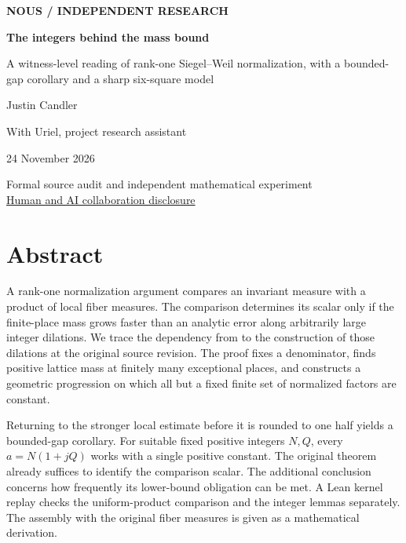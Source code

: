 \documentclass[12pt,letterpaper]{article}
\newcommand{\code}[1]{\texttt{\detokenize{#1}}}
\begin{document}


\thispagestyle{empty}\begin{center}\vspace*{.38in}
{\sffamily\small\bfseries\color{accent}NOUS / INDEPENDENT RESEARCH}\par\vspace{.58in}
{\fontsize{33}{39}\selectfont\bfseries\color{ink}The integers behind the mass bound}\par\vspace{.28in}
\begin{minipage}{.87\linewidth}\centering\Large A witness-level reading of rank-one Siegel--Weil normalization, with a bounded-gap corollary and a sharp six-square model\end{minipage}\par\vspace{.48in}
{\large Justin Candler}\par With Uriel, project research assistant\par 24 November 2026\par\vspace{.42in}
\end{center}\vfill
\begin{center}\small Formal source audit and independent mathematical experiment\\
\hyperref[collab]{Human and AI collaboration disclosure}\end{center}

\clearpage{}\section*{Abstract}
A rank-one normalization argument compares an invariant measure with a product of local fiber measures. The comparison determines its scalar only if the finite-place mass grows faster than an analytic error along arbitrarily large integer dilations. We trace the dependency from \code{sw_one} to the construction of those dilations at the original source revision. The proof fixes a denominator, finds positive lattice mass at finitely many exceptional places, and constructs a geometric progression on which all but a fixed finite set of normalized factors are constant.

Returning to the stronger local estimate before it is rounded to one half yields a bounded-gap corollary. For suitable fixed positive integers \(N,Q\), every \(a=N(1+jQ)\) works with a single positive constant. The original theorem already suffices to identify the comparison scalar. The additional conclusion concerns how frequently its lower-bound obligation can be met. A Lean kernel replay checks the uniform-product comparison and the integer lemmas separately. The assembly with the original fiber measures is given as a mathematical derivation.
\end{document}
